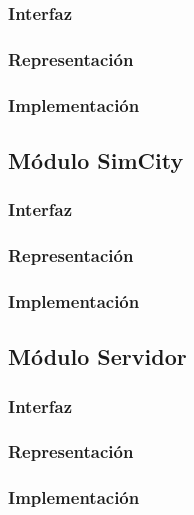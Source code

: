\documentclass[]{aed2-tp}
\begin{document}
\subsubsection{Interfaz}


\subsubsection{Representación}


\newpage
\subsubsection{Implementación}


\newpage
\subsection{Módulo SimCity}
\subsubsection{Interfaz}


\newpage
\subsubsection{Representación}


\newpage
\subsubsection{Implementación}


\newpage
\subsection{Módulo Servidor}
\subsubsection{Interfaz}


\newpage
\subsubsection{Representación}


\newpage
\subsubsection{Implementación}

\end{document}

